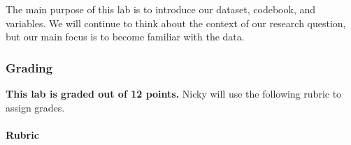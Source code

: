 \documentclass[
  letterpaper,
  DIV=11,
  numbers=noendperiod]{scrartcl}
\let\oldparagraph\paragraph
\renewcommand{\paragraph}[1]{\oldparagraph{#1}\mbox{}}
\begin{document}
The main purpose of this lab is to introduce our dataset, codebook, and
variables. We will continue to think about the context of our research
question, but our main focus is to become familiar with the data.

\hypertarget{grading}{%
\subsubsection{Grading}\label{grading}}

\textbf{This lab is graded out of 12 points.} Nicky will use the
following rubric to assign grades.

\hypertarget{rubric}{%
\paragraph{Rubric}\label{rubric}}
\end{document}
